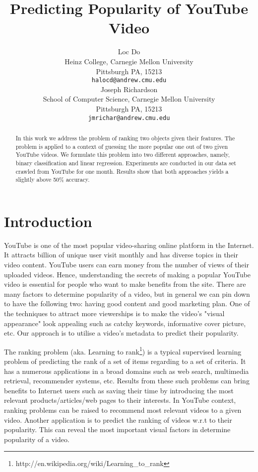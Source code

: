 \documentclass{article} %
\title{Predicting Popularity of YouTube Video}
\author{
Loc Do \\
Heinz College,
Carnegie Mellon University \\
Pittsburgh PA, 15213\\
\texttt{halocd@andrew.cmu.edu} \\
\And
Joseph Richardson \\
School of Computer Science,
Carnegie Mellon University \\
Pittsburgh PA, 15213 \\
\texttt{jmrichar@andrew.cmu.edu} \\
}
\begin{document}
\maketitle

\begin{abstract}
In this work we address the problem of ranking two objects given their features. The problem is applied to a context of guessing the more popular one out of two given YouTube videos. We formulate this problem into two different approaches, namely, binary classification and linear regression. Experiments are conducted in our data set crawled from YouTube for one month. Results show that both approaches yields a slightly above 50\% accuracy.
\end{abstract}

\section{Introduction}
\label{sec:intro}
YouTube is one of the most popular video-sharing online platform in the Internet. It attracts billion of unique user visit monthly and has diverse topics in their video content. YouTube users can earn money from the number of views of their uploaded videos. Hence, understanding the secrets of making a popular YouTube video is essential for people who want to make benefits from the site. There are many factors to determine popularity of a video, but in general we can pin down to have the following two: having good content and good marketing plan. One of the techniques to attract more viewerships is to make the video's "visual appearance" look appealing such as catchy keywords, informative cover picture, etc. Our approach is to utilise a video's metadata to predict their popularity.

The ranking problem (aka. Learning to rank\footnote{http://en.wikipedia.org/wiki/Learning\_to\_rank}) is a typical supervised learning problem of predicting the rank of a set of items regarding to a set of criteria. It has a numerous applications in a broad domains such as web search, multimedia retrieval, recommender systems, etc. Results from these such problems can bring benefits to Internet users such as saving their time by introducing the most relevant products/articles/web pages to their interests. In YouTube context, ranking problems can be raised to recommend most relevant videos to a given video. Another application is to predict the ranking of videos w.r.t to their popularity. This can reveal the most important visual factors in determine popularity of a video.
\end{document}
